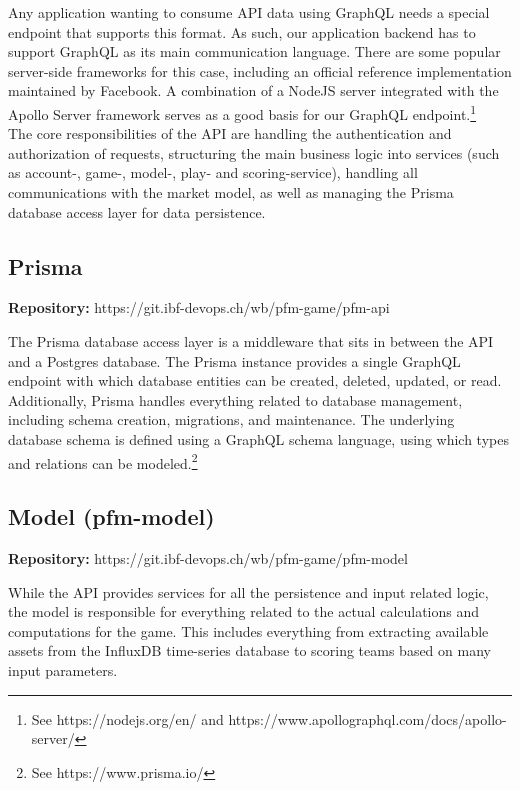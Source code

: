 Any application wanting to consume API data using GraphQL needs a special endpoint that supports this format. As such, our application backend has to support GraphQL as its main communication language. There are some popular server-side frameworks for this case, including an official reference implementation maintained by Facebook. A combination of a NodeJS server integrated with the Apollo Server framework serves as a good basis for our GraphQL endpoint.\footnote{See https://nodejs.org/en/ and https://www.apollographql.com/docs/apollo-server/}\\

The core responsibilities of the API are handling the authentication and authorization of requests, structuring the main business logic into services (such as account-, game-, model-, play- and scoring-service), handling all communications with the market model, as well as managing the Prisma database access layer for data persistence.


\subsection{Prisma}

\begin{flushright}
  \textbf{Repository:} https://git.ibf-devops.ch/wb/pfm-game/pfm-api
\end{flushright}

The Prisma database access layer is a middleware that sits in between the API and a Postgres database. The Prisma instance provides a single GraphQL endpoint with which database entities can be created, deleted, updated, or read. Additionally, Prisma handles everything related to database management, including schema creation, migrations, and maintenance. The underlying database schema is defined using a GraphQL schema language, using which types and relations can be modeled.\footnote{See https://www.prisma.io/}


\subsection{Model (pfm-model)}

\begin{flushright}
  \textbf{Repository:} https://git.ibf-devops.ch/wb/pfm-game/pfm-model
\end{flushright}

While the API provides services for all the persistence and input related logic, the model is responsible for everything related to the actual calculations and computations for the game. This includes everything from extracting available assets from the InfluxDB time-series database to scoring teams based on many input parameters.\\

